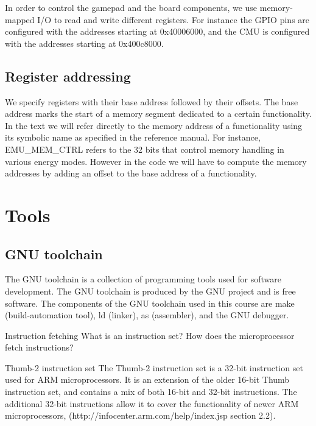 In order to control the gamepad and the board components, we use memory-mapped I/O to read and write different registers. For instance the GPIO pins are configured with the addresses starting at 0x40006000, and the CMU is configured with the addresses starting at 0x400c8000.


\subsection{Register addressing}
We specify registers with their base address followed by their offsets. The base address marks the start of a memory segment dedicated to a certain functionality. In the text we will refer directly to the memory address of a functionality using its symbolic name as specified in the reference manual. For instance, EMU\_MEM\_CTRL refers to the 32 bits that control memory handling in various energy modes. However in the code we will have to compute the memory addresses by adding an offset to the base address of a functionality.



\section{Tools}

\subsection{GNU toolchain}
The GNU toolchain is a collection of programming tools used for software development. The GNU toolchain is produced by the GNU project and is free software. The components of the GNU toolchain used in this course are make (build-automation tool), ld (linker), as (assembler), and the GNU debugger.\cite{gnu.org}

Instruction fetching
What is an instruction set? How does the microprocessor fetch instructions?

Thumb-2 instruction set
The Thumb-2 instruction set is a 32-bit instruction set used for ARM microprocessors. It is an extension of the older 16-bit Thumb instruction set, and contains a mix of both 16-bit and 32-bit instructions. The additional 32-bit instructions allow it to cover the functionality of newer ARM microprocessors, (http://infocenter.arm.com/help/index.jsp section 2.2).

